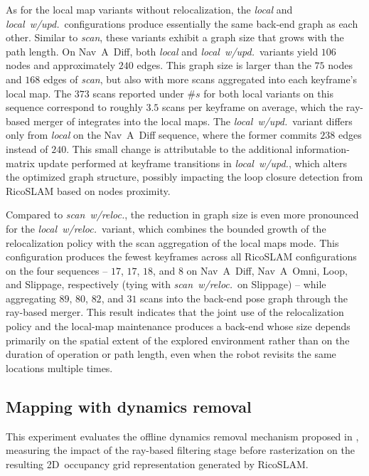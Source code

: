 As for the local map variants without relocalization, the
\emph{local} and \emph{local~w/upd.}\ configurations produce
essentially the same back-end graph as each other.
Similar to \emph{scan}, these variants exhibit a graph size that grows with
the path length. On Nav~A~Diff, both \emph{local} and \emph{local~w/upd.}\
variants yield $106$ nodes and approximately $240$ edges.
This graph size is larger than the $75$ nodes and $168$ edges
of \emph{scan}, but also with more scans aggregated into
each keyframe's local map. The $373$ scans reported under $\#s$ for
both local variants on this sequence correspond to roughly $3.5$
scans per keyframe on average, which the ray-based merger of
 integrates into the local maps.
The \emph{local~w/upd.}\ variant differs only from \emph{local} on the
Nav~A~Diff sequence, where the former commits $238$ edges instead of $240$.
This small change is attributable to the additional information-matrix
update performed at keyframe transitions in \emph{local~w/upd.},
which alters the optimized graph structure, possibly impacting the loop closure
detection from RicoSLAM based on nodes proximity.

Compared to \emph{scan~w/reloc.}, the reduction in graph size is even more
pronounced for the \emph{local~w/reloc.}\ variant, which combines the
bounded growth of the relocalization policy with the scan aggregation of the
local maps mode. This configuration produces the fewest keyframes across
all RicoSLAM configurations on the four sequences -- $17$, $17$,
$18$, and $8$ on Nav~A~Diff, Nav~A~Omni, Loop, and Slippage,
respectively (tying with \emph{scan~w/reloc.}\ on Slippage) -- while
aggregating $89$, $80$, $82$, and $31$ scans into the back-end pose
graph through the ray-based merger. This result indicates that the
joint use of the relocalization policy and the local-map maintenance produces
a back-end whose size depends primarily on the spatial extent of
the explored environment rather than on the duration of operation or path
length, even when the robot revisits the same locations multiple times.

\subsection{Mapping with dynamics removal}\label{sec:slam:results:dynamics}

This experiment evaluates the offline dynamics removal mechanism proposed in
\secref{sec:slam:dynamics:offline}, measuring the impact of the ray-based
filtering stage before rasterization on the resulting 2D~occupancy grid
representation generated by RicoSLAM.

